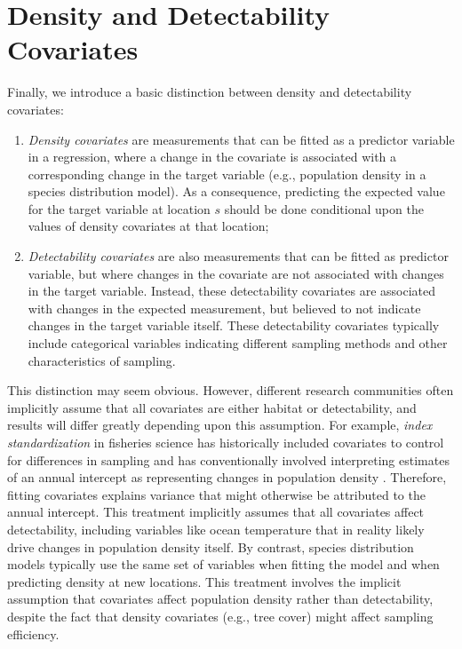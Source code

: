 \section{Density and Detectability Covariates} \label{sec:Chap7_covariates}

Finally, we introduce a basic distinction between density and detectability covariates:

\begin{enumerate}
    \item {}\textit{Density covariates} are measurements that can be fitted as a predictor variable in a regression, where a change in the covariate is associated with a corresponding change in the target variable (e.g., population density in a species distribution model).  As a consequence, predicting the expected value for the target variable at location \(s\) should be done conditional upon the values of density covariates at that location;

    \item {}\textit{Detectability covariates} are also measurements that can be fitted as predictor variable, but where changes in the covariate are not associated with changes in the target variable.  Instead, these detectability covariates are associated with changes in the expected measurement, but believed to not indicate changes in the target variable itself.  These detectability covariates typically include categorical variables indicating different sampling methods and other characteristics of sampling.     
\end{enumerate}
This distinction may seem obvious.  However, different research communities often implicitly assume that all covariates are either habitat or detectability, and results will differ greatly depending upon this assumption.  For example, \textit{index standardization} in fisheries science has historically included covariates to control for differences in sampling and has conventionally involved interpreting estimates of an annual intercept as representing changes in population density \cite{beverton_dynamics_1957}.  Therefore, fitting covariates explains variance that might otherwise be attributed to the annual intercept.  This treatment implicitly assumes that all covariates affect detectability, including variables like ocean temperature that in reality likely drive changes in population density itself.  By contrast, species distribution models typically use the same set of variables when fitting the model and when predicting density at new locations.  This treatment involves the implicit assumption that covariates affect population density rather than detectability, despite the fact that density covariates (e.g., tree cover) might affect sampling efficiency.

